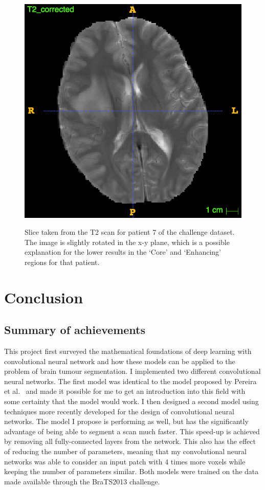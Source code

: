 \documentclass[12pt,a4paper,twoside,openright]{report}
\begin{document}
\begin{figure}[h]
	\centering
	\includegraphics[scale = 0.3]{patient7_t2}
	\label{fig:patient_7_t2}
	\caption{Slice taken from the T2 scan for patient 7 of the challenge dataset. The image is slightly rotated in the x-y plane, which is a possible explanation for the lower results in the `Core' and `Enhancing' regions for that patient.}
\end{figure}

\chapter{Conclusion}
\section{Summary of achievements}
This project first surveyed the mathematical foundations of deep learning with convolutional neural network and how these models can be applied to the problem of brain tumour segmentation. I implemented two different convolutional neural networks. The first model was identical to the model proposed by Pereira et al.\ \cite{Pereira} and made it possible for me to get an introduction into this field with some certainty that the model would work. I then designed a second model using techniques more recently developed for the design of convolutional neural networks. The model I propose is performing as well, but has the significantly advantage of being able to segment a scan much faster. This speed-up is achieved by removing all fully-connected layers from the network. This also has the effect of  reducing the number of parameters, meaning that my convolutional neural networks was able to consider an input patch with 4 times more voxels while keeping the number of parameters similar. Both models were trained on the data made available through the BraTS2013 challenge.
\end{document}
